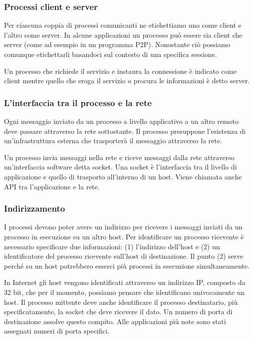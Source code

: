 \documentclass{book}
\begin{document}
\subsubsection*{Processi client e server}
Per ciascuna coppia di processi comunicanti ne etichettiamo uno come client e l'altro come server. In alcune applicazioni un processo può essere sia client che server (come ad esempio in un programma P2P). Nonostante ciò possiamo comunque etichettarli basandoci sul contesto di una specifica sessione.

Un processo che richiede il servizio e instaura la connessione è indicato come client mentre quello che eroga il servizio o procura le informazioni è detto server.

\subsubsection*{L'interfaccia tra il processo e la rete}
Ogni messaggio inviato da un processo a livello applicativo a un altro remoto deve passare attraverso la rete sottostante. Il processo presuppone l'esistenza di un'infrastruttura esterna che trasporterà il messaggio attraverso la rete.

Un processo invia messaggi nella rete e riceve messaggi dalla rete attraverso un'interfaccia software detta socket. Una socket è l'interfaccia tra il livello di applicazione e quello di trasporto all'interno di un host. Viene chiamata anche API tra l'applicazione e la rete.

\subsubsection*{Indirizzamento}
I processi devono poter avere un indirizzo per ricevere i messaggi inviati da un processo in esecuzione su un altro host. Per identificare un processo ricevente è necessario specificare due informazioni: (1) l'indirizzo dell'host e (2) un identificatore del processo ricevente sull'host di destinazione. Il punto (2) serve perché su un host potrebbero esserci più processi in esecuzione simultaneamente.

In Internet gli host vengono identificati attraverso un indirizzo IP, composto da 32 bit, che per il momento, possiamo pensare che identificano univocamente un host. Il processo mittente deve anche identificare il processo destinatario, più specificatamente, la socket che deve ricevere il dato. Un numero di porta di destinazione assolve questo compito. Alle applicazioni più note sono stati assegnati numeri di porta specifici.
\end{document}
